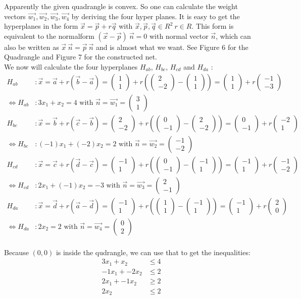 \documentclass{scrartcl}
\newcommand*\colvec[2]{
        \begin{pmatrix} #1 \\ #2 \end{pmatrix}
}
\begin{document}
Apparently the given quadrangle is convex. So one can calculate the weight vectors $\vec{w_1},\vec{w_2},\vec{w_3},\vec{w_4}$ by deriving the four hyper planes.
It is easy to get the hyperplanes in the form $\vec{x} = \vec{p} + r \vec{q}$ with $\vec{x},\vec{p},\vec{q} \in R^2 ~r \in R$. This form is equivalent to the normalform $(\vec{x}-\vec{p})~\vec{n} = 0$ with normal vector $\vec{n}$, which can also be written as $\vec{x} ~ \vec{n} = \vec{p} ~ \vec{n}$ and is almost what we want. See Figure 6 for the Quadrangle and Figure 7 for the constructed net.\\
We now will calculate the four hyperplanes $H_{ab}$, $H_{bc}$, $H_{cd}$ and $H_{da}$ : \\
\begin{align*}
H_{ab}&: \vec{x} = \vec{a} + r (\vec{b}-\vec{a}) = \colvec{1}{1} + r \left(\colvec{2}{-2} - \colvec{1}{1}\right) = \colvec{1}{1} + r \colvec{-1}{-3} \\
\Leftrightarrow H_{ab}&: 3x_1 + x_2 = 4 \text{~with~} \vec{n} = \vec{w_1} = \colvec{3}{1} \\
H_{bc}&: \vec{x} = \vec{b} + r (\vec{c}-\vec{b}) = \colvec{2}{-2} + r \left(\colvec{0}{-1} - \colvec{2}{-2}\right) = \colvec{0}{-1} + r \colvec{-2}{1} \\
\Leftrightarrow H_{bc}&: (-1) x_1 + (-2) x_2 = 2 \text{~with~} \vec{n} = \vec{w_2} = \colvec{-1}{-2}\\
H_{cd}&: \vec{x} = \vec{c} + r (\vec{d}-\vec{c}) = \colvec{-1}{1} + r \left(\colvec{0}{-1} - \colvec{-1}{1}\right) = \colvec{-1}{1} + r \colvec{-1}{-2} \\
\Leftrightarrow H_{cd}&: 2 x_1 + (-1) x_2 = -3 \text{~with~} \vec{n} = \vec{w_3} = \colvec{2}{-1}\\
H_{da}&: \vec{x} = \vec{d} + r (\vec{a}-\vec{d}) = \colvec{-1}{1} + r \left(\colvec{1}{1} - \colvec{-1}{1}\right) = \colvec{-1}{1} + r \colvec{2}{0} \\
\Leftrightarrow H_{da}&: 2 x_2 = 2 \text{~with~} \vec{n} = \vec{w_4} = \colvec{0}{2}\\
\end{align*}

Because $(0,0)$ is inside the qudrangle, we can use that to get the inequalities:
\begin{align*}
3 x_1 + x_2 &\le 4 \\
-1 x_1 + -2 x_2 &\le 2 \\
2 x_1 + -1 x_2 &\ge 2 \\
2 x_2 &\le 2 \\
\end{align*}
\end{document}
